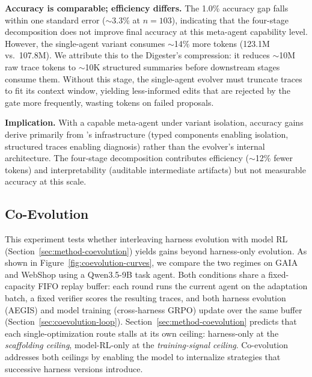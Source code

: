 \textbf{Accuracy is comparable; efficiency differs.} The 1.0\% accuracy gap falls within one standard error (${\sim}$3.3\% at $n{=}103$), indicating that the four-stage decomposition does not improve final accuracy at this meta-agent capability level. However, the single-agent variant consumes ${\sim}$14\% more tokens (123.1M vs.\ 107.8M). We attribute this to the Digester's compression: it reduces ${\sim}$10M raw trace tokens to ${\sim}$10K structured summaries before downstream stages consume them. Without this stage, the single-agent evolver must truncate traces to fit its context window, yielding less-informed edits that are rejected by the gate more frequently, wasting tokens on failed proposals.

\textbf{Implication.} With a capable meta-agent under variant isolation, accuracy gains derive primarily from \ProjectName's infrastructure (typed components enabling isolation, structured traces enabling diagnosis) rather than the evolver's internal architecture. The four-stage decomposition contributes efficiency (${\sim}$12\% fewer tokens) and interpretability (auditable intermediate artifacts) but not measurable accuracy at this scale.


\subsection{Co-Evolution}
\label{sec:exp-coevolution}

This experiment tests whether interleaving harness evolution with model RL (Section~\ref{sec:method-coevolution}) yields gains beyond harness-only evolution. As shown in Figure~\ref{fig:coevolution-curves}, we compare the two regimes on GAIA and WebShop using a Qwen3.5-9B task agent. Both conditions share a fixed-capacity FIFO replay buffer: each round runs the current agent on the adaptation batch, a fixed verifier scores the resulting traces, and both harness evolution (AEGIS) and model training (cross-harness GRPO) update over the same buffer (Section~\ref{sec:coevolution-loop}). Section~\ref{sec:method-coevolution} predicts that each single-optimization route stalls at its own ceiling: harness-only at the \textit{scaffolding ceiling}, model-RL-only at the \textit{training-signal ceiling}. Co-evolution addresses both ceilings by enabling the model to internalize strategies that successive harness versions introduce.

